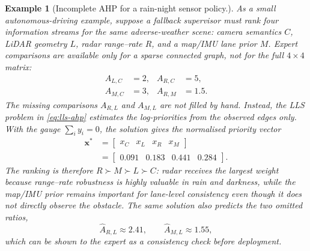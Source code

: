 \documentclass[11pt,oneside,openany]{book}
\newtheorem{example}{Example}[chapter]
\begin{document}
\smallskip
\begin{example}[Incomplete AHP for a rain-night sensor policy.]
As a small autonomous-driving example, suppose a fallback supervisor must rank four information streams for the same adverse-weather scene: camera semantics \(C\), LiDAR geometry \(L\), radar range--rate \(R\), and a map/IMU lane prior \(M\). Expert comparisons are available only for a sparse connected graph, not for the full \(4\times4\) matrix:
\[
\begin{aligned}
A_{L,C}&=2, & A_{R,C}&=5,\\
A_{M,C}&=3, & A_{R,M}&=1.5 .
\end{aligned}
\]
The missing comparisons \(A_{R,L}\) and \(A_{M,L}\) are not filled by hand. Instead, the LLS problem in \eqref{eq:lls-ahp} estimates the log-priorities from the observed edges only. With the gauge \(\sum_i y_i=0\), the solution gives the normalised priority vector
\begin{equation}
\begin{aligned}
\bm{x}^{*}
&=\begin{bmatrix}x_C & x_L & x_R & x_M\end{bmatrix}\\
&=\begin{bmatrix}0.091 & 0.183 & 0.441 & 0.284\end{bmatrix}.
\end{aligned}
\label{eq:incomplete-ahp-example-weights}
\end{equation}
The ranking is therefore \(R \succ M \succ L \succ C\): radar receives the largest weight because range--rate robustness is highly valuable in rain and darkness, while the map/IMU prior remains important for lane-level consistency even though it does not directly observe the obstacle. The same solution also predicts the two omitted ratios,
\begin{equation}
\widehat{A}_{R,L}\approx2.41,\qquad
\widehat{A}_{M,L}\approx1.55,
\end{equation}
which can be shown to the expert as a consistency check before deployment.

\begin{figure}[t]
    \centering
\end{figure}
\end{example}
\end{document}
